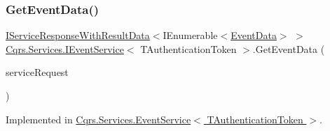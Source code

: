 \subsubsection{\texorpdfstring{Get\+Event\+Data()}{GetEventData()}}
{\footnotesize\ttfamily \hyperlink{interfaceCqrs_1_1Services_1_1IServiceResponseWithResultData}{I\+Service\+Response\+With\+Result\+Data}$<$I\+Enumerable$<$\hyperlink{classCqrs_1_1Events_1_1EventData}{Event\+Data}$>$ $>$ \hyperlink{interfaceCqrs_1_1Services_1_1IEventService}{Cqrs.\+Services.\+I\+Event\+Service}$<$ T\+Authentication\+Token $>$.Get\+Event\+Data (\begin{DoxyParamCaption}\item[{\hyperlink{interfaceCqrs_1_1Services_1_1IServiceRequestWithData}{I\+Service\+Request\+With\+Data}$<$ T\+Authentication\+Token, Guid $>$}]{service\+Request }\end{DoxyParamCaption})}



Implemented in \hyperlink{classCqrs_1_1Services_1_1EventService_a9a68d774ac754e39be56d3e0449f14d7}{Cqrs.\+Services.\+Event\+Service$<$ T\+Authentication\+Token $>$}.

